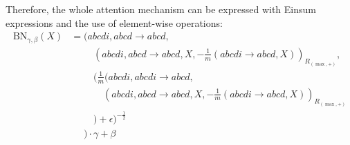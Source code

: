 Therefore, the whole attention mechanism can be expressed with Einsum expressions and the use of element-wise operations:
\begin{align*}
    \text{BN}_{\gamma,\beta}(X) & = (abcdi, abcd \rightarrow abcd,                                                                                   \\
                                & \phantom{{}=\quad}(abcdi, abcd \rightarrow abcd, X,-\frac{1}{m} (abcdi \rightarrow abcd, X))_{R_{(\max,+)}},       \\
                                & \phantom{{}=\quad} (\frac{1}{m} (abcdi,abcdi \rightarrow abcd,                                                     \\
                                & \phantom{{}=\quad\quad} (abcdi, abcd \rightarrow abcd, X, -\frac{1}{m} (abcdi \rightarrow abcd, X))_{R_{(\max,+)}} \\
                                & \phantom{{}=\quad}) + \epsilon)^{-\frac{1}{2}}                                                                     \\
                                & \phantom{{}=}) \cdot \gamma + \beta
\end{align*}